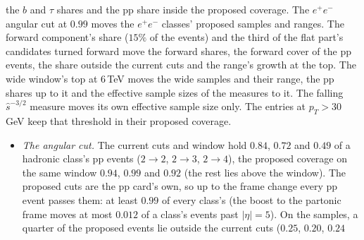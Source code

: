 \documentclass[11pt]{article}
\begin{document}
the $b$ and $\tau$ shares and the pp share inside the proposed coverage. The $e^+e^-$ angular cut at $0.99$ moves the
$e^+e^-$ classes' proposed samples and ranges. The forward component's share ($15\%$ of the events) and the third of
the flat part's candidates turned forward move the forward shares, the forward cover of the pp events, the share
outside the current cuts and the range's growth at the top. The wide window's top at $6$\,TeV moves the wide samples
and their range, the pp shares up to it and the effective sample sizes of the measures to it. The falling
$\hat s^{-3/2}$ measure moves its own effective sample size only. The entries at $p_T>30$\,GeV keep that threshold in
their proposed coverage.
\begin{itemize}
  \item \emph{The angular cut.} The current cuts and window hold $0.84$, $0.72$ and $0.49$ of a hadronic class's pp
    events ($2\to2$, $2\to3$, $2\to4$), the proposed coverage on the same window $0.94$, $0.99$ and $0.92$ (the rest lies
    above the window). The proposed cuts are the pp card's own, so up to the frame change every pp event passes them:
    at least $0.99$ of every class's (the boost to the partonic frame moves at most $0.012$ of a class's events past
    $|\eta|=5$). On the samples, a quarter of the proposed events lie outside the current cuts ($0.25$, $0.20$, $0.24$

\end{itemize}
\end{document}

